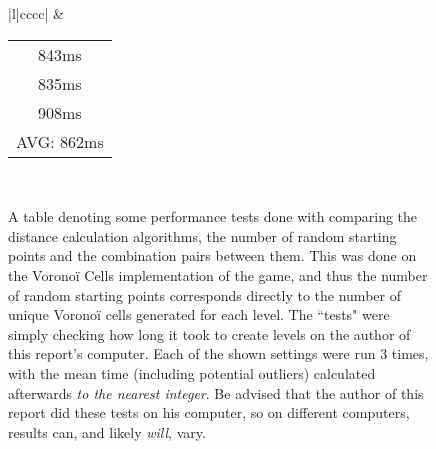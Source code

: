 \begin{figure}[H]
\begin{center}
{\begin{tabular}{|l|cccc|}
       &
      \begin{tabular}[c]{@{}c@{}}843ms\\ 835ms\\ 908ms\\ AVG: 862ms\end{tabular} \\ \hline
    \end{tabular}%
    }
    \end{center}
    \caption{A table denoting some performance tests done with comparing the distance calculation algorithms, the number of random starting points and the combination pairs between them. This was done on the Voronoï Cells implementation of the game, and thus the number of random starting points corresponds directly to the number of unique Voronoï cells generated for each level. The ``tests" were simply checking how long it took to create levels on the author of this report's computer. Each of the shown settings were run 3 times, with the mean time (including potential outliers) calculated afterwards \textit{to the nearest integer}. Be advised that the author of this report did these tests on his computer, so on different computers, results can, and likely \textit{will}, vary.}
    \label{fig:table5}
\end{figure}

